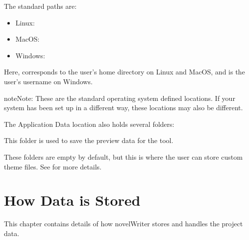 \documentclass[a4paper,11pt,english]{sphinxmanual}
\begin{document}
\sphinxAtStartPar
The standard paths are:
\begin{itemize}
\item {} 
\sphinxAtStartPar
Linux: 

\item {} 
\sphinxAtStartPar
MacOS: 

\item {} 
\sphinxAtStartPar
Windows: 

\end{itemize}

\sphinxAtStartPar
Here, \sphinxcode{\sphinxupquote{\textasciitilde{}}} corresponds to the user’s home directory on Linux and MacOS, and  is the
user’s username on Windows.

\begin{sphinxadmonition}{note}{Note:}
\sphinxAtStartPar
These are the standard operating system defined locations. If your system has been set up in a
different way, these locations may also be different.
\end{sphinxadmonition}

\sphinxAtStartPar
The Application Data location also holds several folders:
\begin{description}
\sphinxAtStartPar
This folder is used to save the preview data for the  tool.

\sphinxAtStartPar
These folders are empty by default, but this is where the user can store custom theme files.
See {\hyperref[\detokenize{more_customise:a-custom}]{}} for more details.

\end{description}

\sphinxstepscope


\chapter{How Data is Stored}
\label{\detokenize{tech_storage:how-data-is-stored}}\label{\detokenize{tech_storage:a-storage}}\label{\detokenize{tech_storage::doc}}
\sphinxAtStartPar
This chapter contains details of how novelWriter stores and handles the project data.
\end{document}
